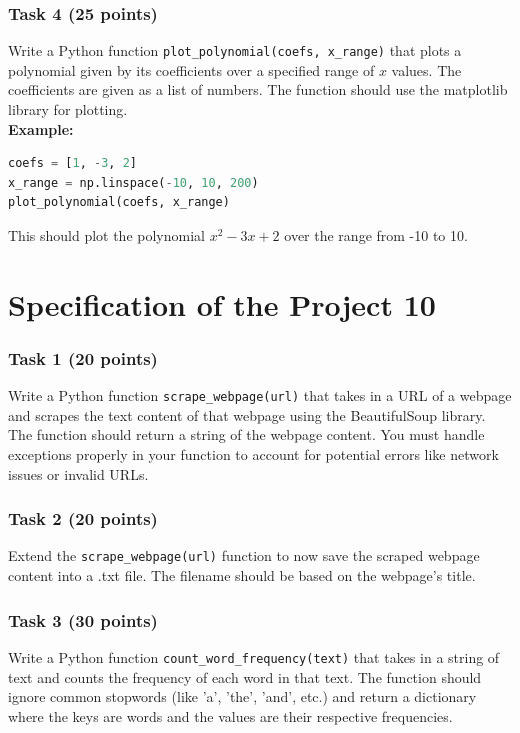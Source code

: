 \documentclass[12pt]{book}
\begin{document}
\subsubsection{Task 4 (25 points)}
Write a Python function \texttt{plot\_polynomial(coefs, x\_range)} that plots a polynomial given by its coefficients over a specified range of $x$ values. The coefficients are given as a list of numbers. The function should use the matplotlib library for plotting. \\
\textbf{Example:}
\begin{lstlisting}[language=Python]
coefs = [1, -3, 2]
x_range = np.linspace(-10, 10, 200)
plot_polynomial(coefs, x_range)
\end{lstlisting}
This should plot the polynomial $x^2 - 3x + 2$ over the range from -10 to 10.
\newpage
\section{Specification of the Project 10}

\subsubsection{Task 1 (20 points)}
Write a Python function \texttt{scrape\_webpage(url)} that takes in a URL of a webpage and scrapes the text content of that webpage using the BeautifulSoup library. The function should return a string of the webpage content. You must handle exceptions properly in your function to account for potential errors like network issues or invalid URLs.

\subsubsection{Task 2 (20 points)}
Extend the \texttt{scrape\_webpage(url)} function to now save the scraped webpage content into a .txt file. The filename should be based on the webpage's title.

\subsubsection{Task 3 (30 points)}
Write a Python function \texttt{count\_word\_frequency(text)} that takes in a string of text and counts the frequency of each word in that text. The function should ignore common stopwords (like 'a', 'the', 'and', etc.) and return a dictionary where the keys are words and the values are their respective frequencies.
\end{document}

